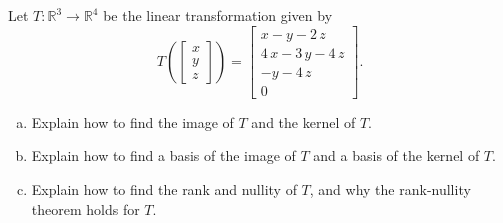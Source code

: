 
\begin{exerciseStatement}
 Let \(T:\mathbb{R}^ 3  \to \mathbb{R}^ 4 \) be the linear transformation given by \[T\left(  \left[\begin{array}{c}
x \\
y \\
z
\end{array}\right]  \right) =  \left[\begin{array}{c}
x - y - 2 \, z \\
4 \, x - 3 \, y - 4 \, z \\
-y - 4 \, z \\
0
\end{array}\right] .\]
\begin{enumerate}[(a)]
\item Explain how to find the image of \(T\) and the kernel of \(T\).
\item Explain how to find a basis of the image of \(T\) and a basis of the kernel of \(T\).
\item Explain how to find the rank and nullity of \(T\), and why the rank-nullity theorem holds for \(T\).
\end{enumerate}
    
\end{exerciseStatement}
    
